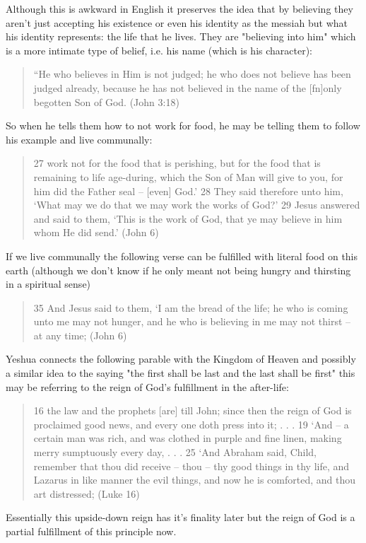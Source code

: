 \documentclass[11pt]{article}
\begin{document}
Although this is awkward in English it preserves the idea that by believing they aren't just accepting his existence or even his identity as the messiah but what his identity represents: the life that he lives. They are "believing into him" which is a more intimate type of belief, i.e. his name (which is his character): 
\begin{quote}
“He who believes in Him is not judged; he who does not believe has been judged already, because he has not believed in the name of the [fn]only begotten Son of God. (John 3:18)
\end{quote}
 So when he tells them how to not work for food, he may be telling them to follow his example and live communally:
\begin{quote}
27 work not for the food that is perishing, but for the food that is remaining to life age-during, which the Son of Man will give to you, for him did the Father seal -- [even] God.' 28 They said therefore unto him, `What may we do that we may work the works of God?' 29 Jesus answered and said to them, `This is the work of God, that ye may believe in him whom He did send.' (John 6)
\end{quote}
If we live communally the following verse can be fulfilled with literal food on this earth (although we don't know if he only meant not being hungry and thirsting in a spiritual sense)
\begin{quote}
35 And Jesus said to them, `I am the bread of the life; he who is coming unto me may not hunger, and he who is believing in me may not thirst -- at any time; (John 6)
\end{quote}
Yeshua connects the following parable with the Kingdom of Heaven and possibly a similar idea to the saying "the first shall be last and the last shall be first" this may be referring to the reign of God's fulfillment in the after-life:
\begin{quote}
16 the law and the prophets [are] till John; since then the reign of God is proclaimed good news, and every one doth press into it; . . .
19 `And -- a certain man was rich, and was clothed in purple and fine linen, making merry sumptuously every day,
 . . . 
25 `And Abraham said, Child, remember that thou did receive -- thou -- thy good things in thy life, and Lazarus in like manner the evil things, and now he is comforted, and thou art distressed; (Luke 16) 
\end{quote}
Essentially this upside-down reign has it's finality later but the reign of God is a partial fulfillment of this principle now.
\end{document}
